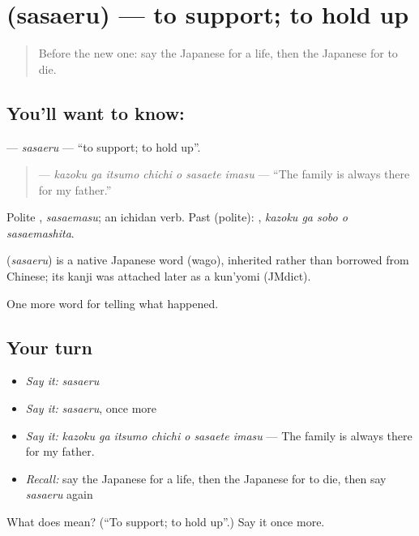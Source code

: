 \section[\texorpdfstring{\ja{ささえる} (sasaeru)}{ささえる (sasaeru)}]{ (sasaeru) — to support; to hold up}

\label{lesson:JA-C292-sasaeru}



\begin{quote}
Before the new one: say the Japanese for a life, then the Japanese for to die.
\end{quote}

\subsection*{You'll want to know: }
\textbf{} — \emph{sasaeru} — \textquotedblleft{}to support; to hold up\textquotedblright{}.

\begin{quote}
\textbf{   } — \emph{kazoku ga itsumo chichi o sasaete imasu} — \textquotedblleft{}The family is always there for my father.\textquotedblright{}
\end{quote}

Polite \textbf{}, \emph{sasaemasu}; an ichidan verb. Past (polite): \textbf{  }, \emph{kazoku ga sobo o sasaemashita}.

\begin{cousinweb}
\textbf{} (\emph{sasaeru}) is a native Japanese word (wago), inherited rather than borrowed from Chinese; its kanji was attached later as a kun'yomi (JMdict).
\end{cousinweb}

\begin{grammarlens}[title={What you've built}]
One more word for telling what happened.
\end{grammarlens}

\subsection*{Your turn}
\begin{itemize}
\raggedright
  \item \emph{Say it:} \emph{sasaeru}
  \item \emph{Say it:} \emph{sasaeru}, once more
  \item \emph{Say it:} \emph{kazoku ga itsumo chichi o sasaete imasu} — The family is always there for my father.
  \item \emph{Recall:} say the Japanese for a life, then the Japanese for to die, then say \emph{sasaeru} again
\end{itemize}

\begin{tcolorbox}[breakable,colback=teal!4,colframe=teal!35!black,title={Before you move on}]
What does  mean? (\textquotedblleft{}To support; to hold up\textquotedblright{}.) Say it once more.
\end{tcolorbox}
